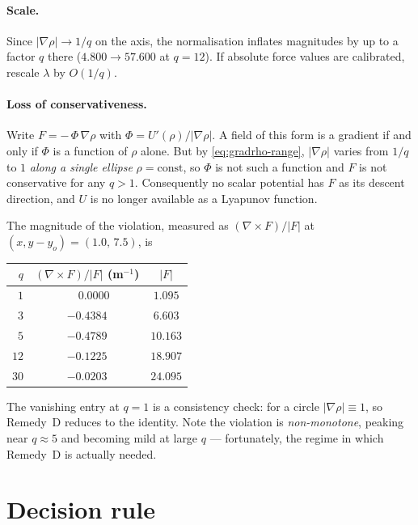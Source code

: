 \documentclass[11pt]{article}
\begin{document}
\paragraph{Scale.}
Since $|\nabla\rho|\to1/q$ on the axis, the normalisation inflates magnitudes
by up to a factor $q$ there ($4.800\to57.600$ at $q=12$). If absolute force
values are calibrated, rescale $\lambda$ by $O(1/q)$.

\paragraph{Loss of conservativeness.}
Write $F=-\,\Phi\,\nabla\rho$ with $\Phi=U'(\rho)/|\nabla\rho|$. A field of
this form is a gradient if and only if $\Phi$ is a function of $\rho$ alone.
But by \eqref{eq:gradrho-range}, $|\nabla\rho|$ varies from $1/q$ to $1$
\emph{along a single ellipse} $\rho=\text{const}$, so $\Phi$ is not such a
function and $F$ is not conservative for any $q>1$. Consequently no scalar
potential has $F$ as its descent direction, and $U$ is no longer available as
a Lyapunov function.

The magnitude of the violation, measured as
$(\nabla\times F)/|F|$ at $(x,y-y_{o})=(1.0,\,7.5)$, is

\begin{center}
\begin{tabular}{rcc}
\toprule
$q$ & $(\nabla\times F)/|F|$ (m$^{-1}$) & $|F|$\\
\midrule
$1$  & $\phantom{-}0.0000$ & $1.095$\\
$3$  & $-0.4384$ & $6.603$\\
$5$  & $-0.4789$ & $10.163$\\
$12$ & $-0.1225$ & $18.907$\\
$30$ & $-0.0203$ & $24.095$\\
\bottomrule
\end{tabular}
\end{center}

\noindent
The vanishing entry at $q=1$ is a consistency check: for a circle
$|\nabla\rho|\equiv1$, so Remedy~D reduces to the identity. Note the
violation is \emph{non-monotone}, peaking near $q\approx5$ and becoming mild
at large $q$ --- fortunately, the regime in which Remedy~D is actually needed.

\section{Decision rule}
\end{document}
